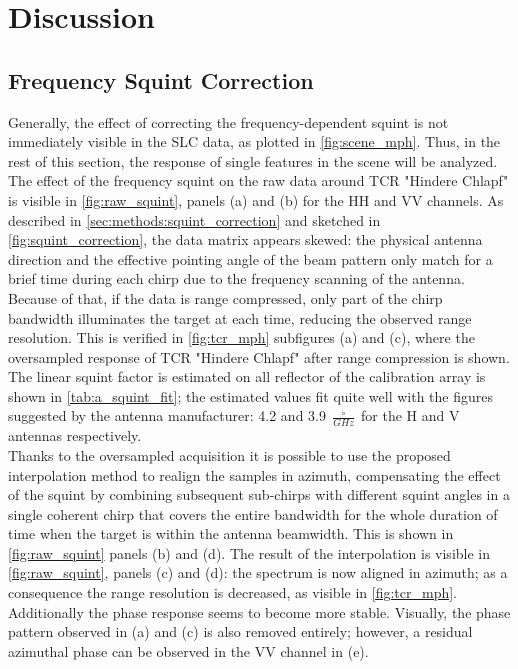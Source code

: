 \section{Discussion}\label{sec:discussion}
\subsection{Frequency Squint Correction}\label{sec:discussion:squint_correction}
Generally, the effect of correcting the frequency-dependent squint is not immediately visible in the SLC data, as plotted in \autoref{fig:scene_mph}. Thus, in the rest of this section, the response of single features in the scene will be analyzed.
The effect of the frequency squint on the raw data around TCR "Hindere Chlapf" is visible in \autoref{fig:raw_squint}, panels (a) and (b) for the HH and VV channels. As described in 
\autoref{sec:methods:squint_correction} and sketched in \autoref{fig:squint_correction}, the data matrix appears skewed:  the physical antenna direction and the effective pointing angle of the beam pattern only match for a brief time during each chirp due to the frequency scanning of the antenna. Because of that, if the data is range compressed, only part of the chirp bandwidth illuminates the target at each time, reducing the observed range resolution. This is verified in \autoref{fig:tcr_mph} subfigures (a) and (c), where the oversampled response of TCR "Hindere Chlapf" after range compression is shown.\\
The linear squint factor is estimated on all reflector of the calibration array is shown in \autoref{tab:a_squint_fit};
the estimated values fit quite well with the figures suggested by the antenna manufacturer: 4.2 and 3.9 $\frac{\circ}{GHz}$ for the H and V antennas respectively.\\
Thanks to the oversampled acquisition it is possible to use the proposed interpolation method to realign the samples in azimuth, compensating the effect of the squint by combining subsequent sub-chirps with different squint angles in a single coherent chirp that covers the entire bandwidth for the whole duration of time when the target is within the antenna beamwidth. This is shown in \autoref{fig:raw_squint} panels (b) and (d). The result of the interpolation is visible in \autoref{fig:raw_squint}, panels (c) and (d): the spectrum is now aligned in azimuth; as a consequence the range resolution is decreased, as visible in \autoref{fig:tcr_mph}. Additionally the phase response seems to become more stable.
Visually, the phase pattern observed in (a) and (c) is also removed entirely; however, a residual azimuthal phase can be observed in the VV channel in (e).
